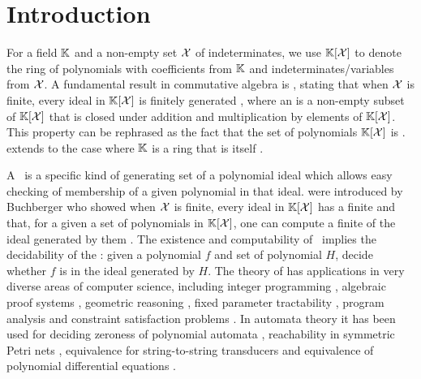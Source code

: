\section{Introduction}
\label{sec:intro}

\AP For a field $\mathbb{K}$ and a non-empty set $\mathcal{X}$ of indeterminates, we use
$\mathbb{K}[\mathcal{X}]$ to denote the ring of polynomials with coefficients from $\mathbb{K}$
and indeterminates/variables from $\mathcal{X}$. A fundamental result in commutative
algebra is , stating that when $\mathcal{X}$ is finite,
every ideal in $\mathbb{K}[\mathcal{X}]$ is finitely generated \cite{HILB1890}, where an
 is a non-empty subset of $\mathbb{K}[\mathcal{X}]$ that is closed under
addition and multiplication by elements of $\mathbb{K}[\mathcal{X}]$. This property can
be rephrased as the fact that the set of polynomials $\mathbb{K}[\mathcal{X}]$ is
.  extends to the case where $\mathbb{K}$
is a ring that is itself  \cite[Theorem 4.1]{Lang02}.

\AP A \intro*\Grb\ is a specific kind of generating set of a polynomial ideal
which allows easy checking of membership of a given polynomial in that ideal.
 were introduced by Buchberger who showed when $\mathcal{X}$ is
finite, every ideal in $\mathbb{K}[\mathcal{X}]$ has a finite  and
that, for a given a set of polynomials in $\mathbb{K}[\mathcal{X}]$, one can compute a
finite  of the ideal generated by them \cite{BUCH76}. The
existence and computability of \Grbs\ implies the decidability of the
: given a polynomial $f$ and set of polynomial
$H$, decide whether $f$ is in the ideal generated by $H$. The theory of
 has applications in very diverse areas of computer
science, including integer programming \cite{Sturmfels96}, algebraic proof
systems \cite{algProof}, geometric reasoning \cite{Cox2015chGeom}, fixed
parameter tractability \cite{ACDM22}, program analysis \cite{SSM04} and
constraint satisfaction problems \cite{Mas21}.
In automata theory it has been used for deciding zeroness of polynomial
automata \cite{BEDUSHWO17}, reachability in symmetric Petri nets \cite{MAME82},
equivalence for string-to-string transducers \cite{HONKALA00} and equivalence
of polynomial differential equations \cite{CLEMENTE24}. 

